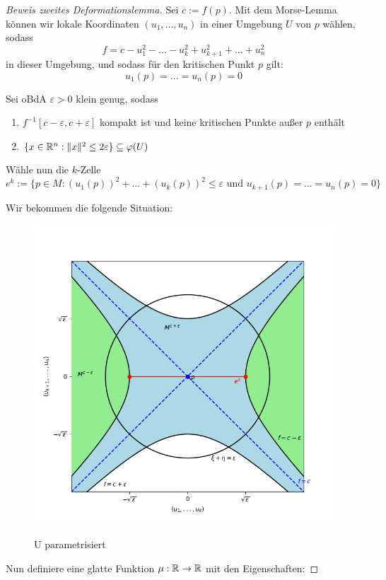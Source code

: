 \begin{proof}[Beweis zweites Deformationslemma]
    Sei $c := f(p)$. Mit dem Morse-Lemma können wir lokale Koordinaten 
    $(u_1, ..., u_n)$ in einer Umgebung $U$ von $p$ wählen, sodass
    \[ f = c - u_1^2 - ... - u_k^2 + u_{k+1}^2 + ... + u_n^2 \]
    in dieser Umgebung, und sodass für den kritischen Punkt $p$ gilt:
    \[ u_1(p) = ... = u_n(p) = 0 \]

    Sei oBdA $\varepsilon > 0$ klein genug, sodass 
    \begin{enumerate}
        \item $f^{-1}[c - \varepsilon, c + \varepsilon]$ kompakt ist und keine
            kritischen Punkte außer $p$ enthält
        \item $\{ x \in { \mathbb R }^n: \lVert x \rVert^2 \leq 2 \varepsilon \} \subseteq \varphi(U) $
    \end{enumerate}

    Wähle nun die $k$-Zelle 
    \[ 
        e^k := \{ p \in M: (u_1(p))^2 + ... + (u_k(p))^2 \leq \varepsilon 
        \text{ und } u_{k+1}(p) = ... = u_n(p) = 0 \} 
    \]

    Wir bekommen die folgende Situation:

    \begin{figure}[H]
        \centering
        \includegraphics[width=0.8\linewidth]{resources/Me-Diagram6-U-parameterized.png}
        \label{fig:me-diagram6}
        \caption{U parametrisiert}
    \end{figure}

    Nun definiere eine glatte Funktion $\mu: { \mathbb R } \to { \mathbb R }$ mit den Eigenschaften:


\end{proof}
